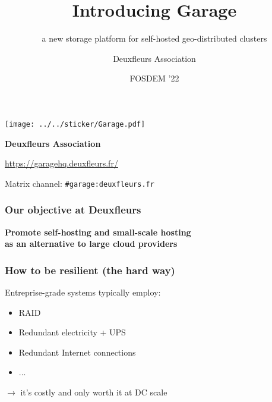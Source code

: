 \documentclass[aspectratio=169]{beamer}
\title{Introducing Garage}
\subtitle{a new storage platform for self-hosted geo-distributed clusters}
\author{Deuxfleurs Association}
\date{FOSDEM '22}
\begin{document}
\begin{frame}
	\centering
	\texttt{[image: ../../sticker/Garage.pdf]}
	\vspace{1em}

	{\large\bf Deuxfleurs Association}
	\vspace{1em}

	\url{https://garagehq.deuxfleurs.fr/}

	Matrix channel: \texttt{\#garage:deuxfleurs.fr}
\end{frame}

\begin{frame}
	\frametitle{Our objective at Deuxfleurs}
	
	\begin{center}
		\textbf{Promote self-hosting and small-scale hosting\\
			as an alternative to large cloud providers}
	\end{center}
	\vspace{2em}
\end{frame}

\begin{frame}
	\frametitle{How to be resilient (the hard way)}

	Entreprise-grade systems typically employ:
	\vspace{1em}
	\begin{itemize}
		\item RAID
		\item Redundant electricity + UPS
		\item Redundant Internet connections
		\item ... 
	\end{itemize}
	\vspace{1em}
	$\to$ it's costly and only worth it at DC scale
\end{frame}
\end{document}
